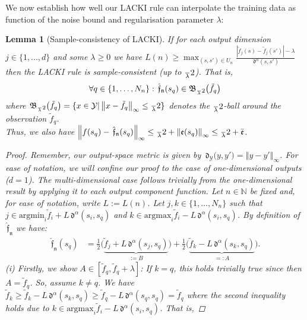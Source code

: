 \documentclass{article} %
\newtheorem{lem}[thm]{Lemma}
\theoremstyle{definition}
\theoremstyle{remark}
\newcommand{\norm}[1]{\left\Vert#1\right\Vert}
\newcommand{\abs}[1]{\left\vert#1\right\vert}
\newcommand{\nat}{\mathbb N}
\newcommand{\argmin}{\text{argmin}}
\newcommand{\argmax}{\text{argmax}}
\newcommand{\vc}[1]{#1}
\newcommand{\ball}[2]{\ensuremath{\mathfrak B_{\vc{#1}} \bigl( #2\bigr) }}
\newcommand{\outspace}{\ensuremath{ \mathcal Y}}
\newcommand{\metric}{\, \mathfrak{d}} %
\newcommand{\Metrico}[2]{\metric_\outspace\bigl(#1,#2\bigr) }
\newcommand{\predfn}{\, \mathfrak{  \hat f_n}} %
\newcommand{\hexp}{{ \alpha }}%
\newcommand{\hestthresh}{\ensuremath{ \lambda}}
\newcommand{\obserrpar}{e} %
\newcommand{\obserr}{\mathfrak e} %
\newcommand{\obserrbnd}{\bar{\mathfrak e}}
\begin{document}
We now establish how well our LACKI rule can interpolate the training data as function of the noise bound and regularisation parameter $\hestthresh$: 
\begin{lem}[Sample-consistency of LACKI] \label{lem:LACKIsampleconsistency} If for each output dimension $j \in \{1,...,d\}$ and some $\hestthresh \geq 0$ we have $L(n)  \geq  \max_{(s,s') \in U_n} \frac{\abs{\tilde f_j(s)- \tilde f_j(s')} -\hestthresh }{\metric^\hexp(s,s')}
$ then the LACKI rule is sample-consistent (up to $\frac \hestthresh 2$). 
That is,  \[\forall q \in \{1,\ldots,N_n \}:  \predfn(s_q) \in \ball{\frac \hestthresh 2}{\tilde f_q} \] where $\ball{\frac \hestthresh 2}{\tilde f_q} =\{ x \in \outspace |  \norm{x-\tilde f_q}_\infty \leq \frac \hestthresh 2\}$ denotes the $\frac \hestthresh 2$-ball around the observation $\tilde f_q$.\\
Thus, we also have $\norm{ f(s_q) - \predfn(s_q)}_\infty \leq \frac \hestthresh 2 + \norm{\obserr(s_q)}_\infty \leq \frac \hestthresh 2 + \obserrbnd$.
\begin{proof}
Remember, our output-space metric is given by $\Metrico{y}{y'} = \norm{y-y'}_\infty$.
For ease of notation, we will confine our proof to the case of one-dimensional outputs ($d=1$). The multi-dimensional case follows trivially from the one-dimensional result by applying it to each output component function. 
Let $n \in \nat  $ be fixed and, for ease of notation, write $L := L(n)$. Let $j,k \in   \{1,\ldots,N_n \} $ such that $j \in \argmin_i \tilde f_i + L \metric^\hexp(s_i,s_q) $ and 
$k \in \argmax_i \tilde f_i - L \metric^\hexp(s_i,s_q) $. 
By definition of $\predfn$ we have:
\begin{align}
\predfn(s_q) 
&= \frac 1 2 \bigl(\underbrace{ \tilde f_j + L \metric^\hexp(s_j,s_q)}_{:=B}   \bigr) + \frac 1 2 \bigl( \underbrace{\tilde  f_k - L \metric^\hexp(s_k,s_q) }_{=:A}\bigr). \label{eq:hru582jsokbbbn}
\end{align}
%
%
(i) Firstly, we show  \underline{$ A \in [\tilde f_q, \tilde f_q +\hestthresh]$}:
If $k = q$, this holds trivially true since then $A= \tilde f_q$. 
So, assume $k \neq q$. 
We have $\tilde f_k \geq \tilde f_k - L \metric^\hexp(s_k,s_q)  \geq \tilde f_q - L \metric^\hexp(s_q,s_q)  = \tilde f_q$ where the second inequality holds due to $k \in \argmax_i \tilde f_i - L \metric^\hexp(s_i,s_q) $. That is,

\end{proof}
\end{lem}
\end{document}
